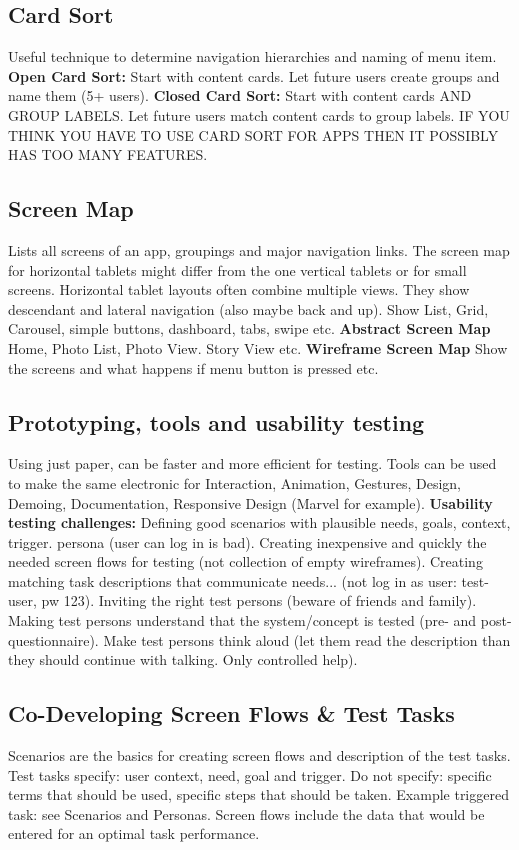 \subsection{Card Sort}
Useful technique to determine navigation hierarchies and naming of menu item.
\textbf{Open Card Sort:} Start with content cards. Let future users create groups and name them (5+ users). 
\textbf{Closed Card Sort:} Start with content cards AND GROUP LABELS. Let future users match content cards to group labels.
IF YOU THINK YOU HAVE TO USE CARD SORT FOR APPS THEN IT POSSIBLY HAS TOO MANY FEATURES.

\subsection{Screen Map}
Lists all screens of an app, groupings and major navigation links.
The screen map for horizontal tablets might differ from the one vertical tablets or for small screens.
Horizontal tablet layouts often combine multiple views.
They show descendant and lateral navigation (also maybe back and up). Show List, Grid, Carousel, simple buttons, dashboard, tabs, swipe etc.
\textbf{Abstract Screen Map} Home, Photo List, Photo View. Story View etc.
\textbf{Wireframe Screen Map} Show the screens and what happens if menu button is pressed etc.

\subsection{Prototyping, tools and usability testing}
Using just paper, can be faster and more efficient for testing. Tools can be used to make the same electronic for Interaction, Animation, Gestures, Design, Demoing, Documentation, Responsive Design (Marvel for example). \textbf{Usability testing challenges:} Defining good scenarios with plausible needs, goals, context, trigger. persona (user can log in is bad). Creating inexpensive and quickly the needed screen flows for testing (not collection of empty wireframes). Creating matching task descriptions that communicate needs... (not log in as user: test-user, pw 123). Inviting the right test persons (beware of friends and family). Making test persons understand that the system/concept is tested (pre- and post- questionnaire). Make test persons think aloud (let them read the description than they should continue with talking. Only controlled help).

\subsection{Co-Developing Screen Flows \& Test Tasks}
Scenarios are the basics for creating screen flows and description of the test tasks. Test tasks specify: user context, need, goal and trigger. Do not specify: specific terms that should be used, specific steps that should be taken. Example triggered task: see Scenarios and Personas. Screen flows include the data that would be entered for an optimal task performance.

